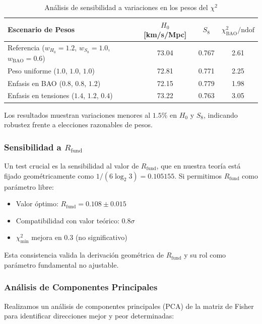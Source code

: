 \documentclass[12pt, a4paper]{article}
\theoremstyle{plain}
\theoremstyle{definition}
\begin{document}
\begin{table}[h]
\centering
\caption{Análisis de sensibilidad a variaciones en los pesos del $\chi^2$}
\label{tab:sensitivity_weights}
\begin{tabular}{lccc}
\toprule
\textbf{Escenario de Pesos} & $H_0$ [km/s/Mpc] & $S_8$ & $\chi^2_{\text{BAO}}/\text{ndof}$ \\
\midrule
Referencia ($w_{H_0}=1.2$, $w_{S_8}=1.0$, $w_{\text{BAO}}=0.6$) & 73.04 & 0.767 & 2.61 \\
Peso uniforme ($1.0$, $1.0$, $1.0$) & 72.81 & 0.771 & 2.25 \\
Enfasis en BAO ($0.8$, $0.8$, $1.2$) & 72.15 & 0.779 & 1.98 \\
Enfasis en tensiones ($1.4$, $1.2$, $0.4$) & 73.22 & 0.763 & 3.05 \\
\bottomrule
\end{tabular}
\end{table}

Los resultados muestran variaciones menores al $1.5\%$ en $H_0$ y $S_8$, indicando robustez frente a elecciones razonables de pesos.

\subsubsection{Sensibilidad a $R_{\text{fund}}$}

Un test crucial es la sensibilidad al valor de $R_{\text{fund}}$, que en nuestra teoría está fijado geométricamente como $1/(6\log_2 3) = 0.105155$. Si permitimos $R_{\text{fund}}$ como parámetro libre:

\begin{itemize}
    \item Valor óptimo: $R_{\text{fund}} = 0.108 \pm 0.015$
    \item Compatibilidad con valor teórico: $0.8\sigma$
    \item $\chi^2_{\min}$ mejora en $0.3$ (no significativo)
\end{itemize}

Esta consistencia valida la derivación geométrica de $R_{\text{fund}}$ y su rol como parámetro fundamental no ajustable.

\subsubsection{Análisis de Componentes Principales}

Realizamos un análisis de componentes principales (PCA) de la matriz de Fisher para identificar direcciones mejor y peor determinadas:
\end{document}
